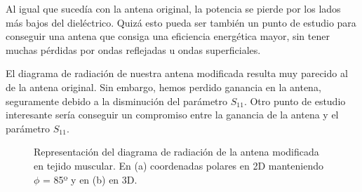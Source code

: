 Al igual que sucedía con la antena original, la potencia se pierde por los lados más bajos del dieléctrico. Quizá esto pueda ser también un punto de estudio para conseguir una antena que consiga una eficiencia energética mayor, sin tener muchas pérdidas por ondas reflejadas u ondas superficiales.

El diagrama de radiación de nuestra antena modificada resulta muy parecido al de la antena original. Sin embargo, hemos perdido ganancia en la antena, seguramente debido a la disminución del parámetro $S_{11}$. Otro punto de estudio interesante sería conseguir un compromiso entre la ganancia de la antena y el parámetro $S_{11}$.

\begin{figure}[!htb]
    \centering
    \caption{Representación del diagrama de radiación de la antena modificada en tejido muscular. En (a) coordenadas polares en 2D manteniendo $\phi$ = 85º y en (b) en 3D.}
    \label{fig:fig5.30}
\end{figure}

